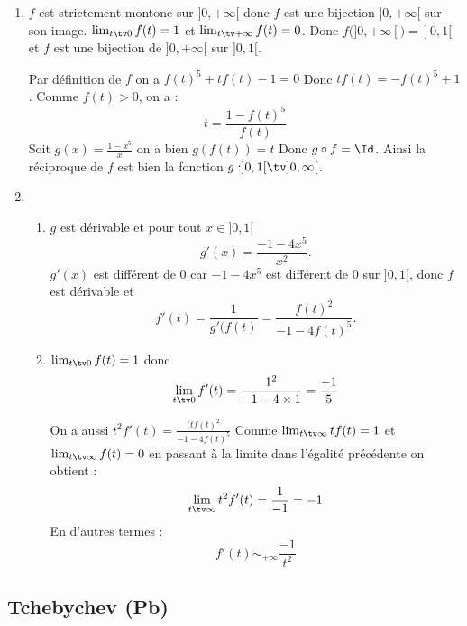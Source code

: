 \begin{correction}
\begin{enumerate}
\item $f$ est strictement  montone sur $]0,+\infty[$ donc $f$ est une bijection $]0,+\infty[$ sur son image. $\lim_{t\tv 0 }f(t)=1$ et  $\lim_{t\tv +\infty }f(t)=0$. Donc $f( ]0,+\infty[) =]0,1[$ et $f$ est une bijection de $]0,+\infty[$ sur $]0,1[$. 

Par définition de $f$ on  a
$f(t)^5 +tf(t)-1=0$
Donc 
$tf(t) =  -f(t)^5 +1$. Comme $f(t)>0$, on  a :
$$t =\frac{1-f(t)^5}{f(t)}$$
Soit $g(x) = \frac{1-x^5}{x}$ on a bien $g(f(t)) =t$ Donc $g\circ f =\Id$. Ainsi  la réciproque de $f$  est bien la fonction $g : ]0,1[\tv ]0,\infty[$. 
\item 
\begin{enumerate}
\item $g$ est dérivable et pour tout $x\in ]0,1[$ 
$$g'(x) = \frac{-1-4x^5}{x^2}.$$
$g'(x) $ est différent de $0$ car $-1-4x^5$ est différent de $0$ sur $]0,1[$, donc $f$ est dérivable et 
$$f'(t) =\frac{1}{g'(f(t)} =  \frac{f(t)^2}{ -1-4f(t)^5}.$$

\item $\lim_{t\tv 0} f(t) = 1$ donc $$\lim_{t\tv 0} f'(t) = \frac{1^2}{-1-4\times 1 }= \frac{-1}{5}$$

On  a aussi 
$t^2 f'(t) = \frac{(tf(t)^2}{-1-4 f(t)^5}$ Comme $\lim_{t\tv \infty } tf(t)=1 $ et $\lim_{t\tv \infty } f(t)=0 $  en passant à la limite dans l'égalité précédente on obtient : 
$$\lim_{t\tv \infty } t^2f'(t)=\frac{1}{-1}=-1 $$ 
En d'autres termes : 
$$f'(t) \sim_{+\infty} \frac{-1}{t^2}$$

\end{enumerate}



\end{enumerate}
\end{correction}



\subsection{Tchebychev (Pb)}


